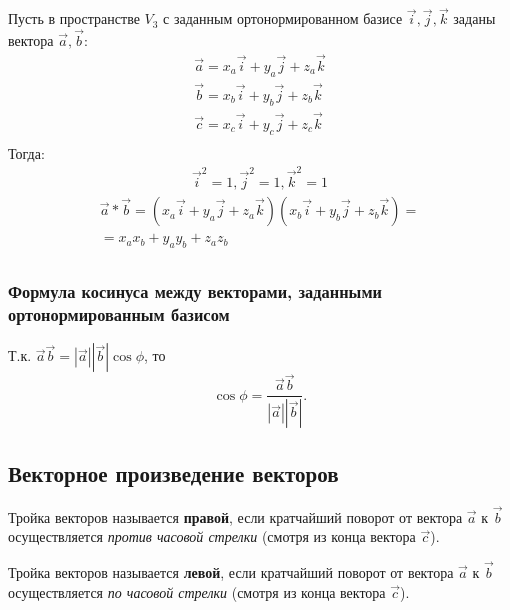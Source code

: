 Пусть в пространстве $V_3$ с заданным ортонормированном базисе $\vec{i}, \vec{j}, \vec{k}$ заданы вектора $\vec{a}, \vec{b}$:
\begin{gather*}
  \vec{a} = x_a \vec{i} + y_a \vec{j} + z_a \vec{k} \\
  \vec{b} = x_b \vec{i} + y_b \vec{j} + z_b \vec{k} \\
  \vec{c} = x_c \vec{i} + y_c \vec{j} + z_c \vec{k} \\
\end{gather*}
Тогда:
\begin{gather*}
  \vec{i}^2 = 1, \vec{j}^2 = 1, \vec{k}^2 = 1
\end{gather*}
\begin{gather*}
  \vec{a} * \vec{b} = \left( x_a \vec{i} + y_a \vec{j} + z_a \vec{k} \right) \left( x_b \vec{i} + y_b \vec{j} + z_b \vec{k} \right) = \\
  = x_a x_b + y_a y_b + z_a z_b \\
\end{gather*}

\subsubsection{Формула косинуса между векторами, заданными ортонормированным базисом}

Т.к. $\vec{a} \vec{b} = |\vec{a}| |\vec{b}| \cos \phi$, то  \[
\cos \phi = \frac{\vec{a} \vec{b}}{|\vec{a}| |\vec{b}|}.
\] 


\subsection{Векторное произведение векторов}

\begin{definition}
  Тройка векторов называется \textbf{правой}, если кратчайший поворот от вектора $\vec{a}$ к $\vec{b}$ осуществляется \textit{против часовой стрелки} (смотря из конца вектора $\vec{c}$).
\end{definition}

\begin{definition}
  Тройка векторов называется \textbf{левой}, если кратчайший поворот от вектора $\vec{a}$ к $\vec{b}$ осуществляется \textit{по часовой стрелки} (смотря из конца вектора $\vec{c}$).
\end{definition}

